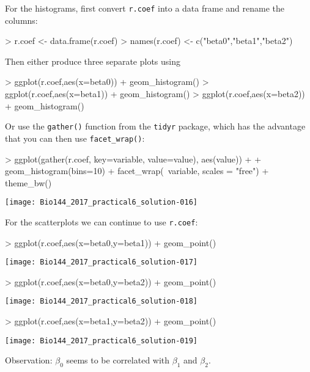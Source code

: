 \documentclass[a4paper,12pt]{scrartcl}
\begin{document}
\begin{enumerate}[a)]
For the histograms, first convert \texttt{r.coef} into a data frame and rename the columns:
\begin{Schunk}
\begin{Sinput}
> r.coef <- data.frame(r.coef)
> names(r.coef) <- c("beta0","beta1","beta2")
\end{Sinput}
\end{Schunk}
Then either produce three separate plots using
\begin{Schunk}
\begin{Sinput}
> ggplot(r.coef,aes(x=beta0)) + geom_histogram()
> ggplot(r.coef,aes(x=beta1)) + geom_histogram()
> ggplot(r.coef,aes(x=beta2)) + geom_histogram()
\end{Sinput}
\end{Schunk}

Or use the \texttt{gather()} function from the \texttt{tidyr} package, which has the advantage that you can then use \texttt{facet\_wrap()}:
\begin{Schunk}
\begin{Sinput}
> ggplot(gather(r.coef, key=variable, value=value), aes(value)) +
+   geom_histogram(bins=10) + facet_wrap(~variable, scales = "free") + theme_bw()
\end{Sinput}
\end{Schunk}
\texttt{[image: Bio144\_2017\_practical6\_solution-016]}




% 
For the scatterplots we can continue to use \texttt{r.coef}:

\begin{Schunk}
\begin{Sinput}
> ggplot(r.coef,aes(x=beta0,y=beta1)) + geom_point()  
\end{Sinput}
\end{Schunk}
\texttt{[image: Bio144\_2017\_practical6\_solution-017]}
\begin{Schunk}
\begin{Sinput}
> ggplot(r.coef,aes(x=beta0,y=beta2)) + geom_point()
\end{Sinput}
\end{Schunk}
\texttt{[image: Bio144\_2017\_practical6\_solution-018]}
\begin{Schunk}
\begin{Sinput}
> ggplot(r.coef,aes(x=beta1,y=beta2)) + geom_point()
\end{Sinput}
\end{Schunk}
\texttt{[image: Bio144\_2017\_practical6\_solution-019]}

Observation:  $\beta_0$ seems to be correlated with $\beta_1$ and $\beta_2$.

\end{enumerate}
\end{document}
